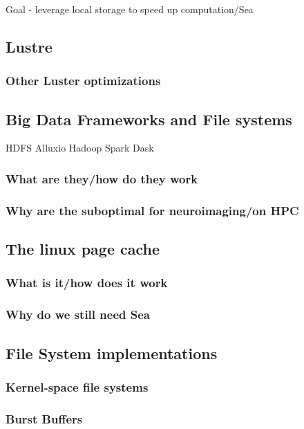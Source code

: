 \documentclass[10pt,journal,compsoc]{IEEEtran}
\begin{document}

Goal - leverage local storage to speed up computation/Sea


\subsection{Lustre}
\subsubsection{Other Luster optimizations}
\subsection{Big Data Frameworks and File systems}
HDFS Alluxio Hadoop Spark Dask
\subsubsection{What are they/how do they work}
\subsubsection{Why are the suboptimal for neuroimaging/on HPC}
\subsection{The linux page cache}
\subsubsection{What is it/how does it work}
\subsubsection{Why do we still need Sea}
\subsection{File System implementations}
\subsubsection{Kernel-space file systems}
\subsubsection{Burst Buffers}
\end{document}
